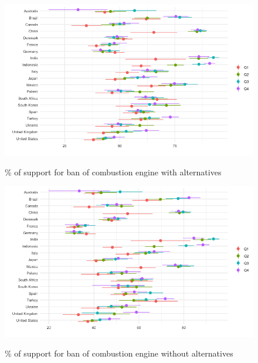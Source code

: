 \begin{frame}{}%
\begin{figure}[h!]
\caption{\% of support for ban of combustion engine with alternatives} %
\includegraphics[width=.7\paperwidth]{../figures/country_comparison/standard_public_transport_support_income_each_country.png} \\
\end{figure}
\end{frame}

\begin{frame}{}%
\begin{figure}[h!]
\caption{\% of support for ban of combustion engine without alternatives} %
\includegraphics[width=.7\paperwidth]{../figures/country_comparison/standard_support_income_each_country.png} \\
\end{figure}
\end{frame}

